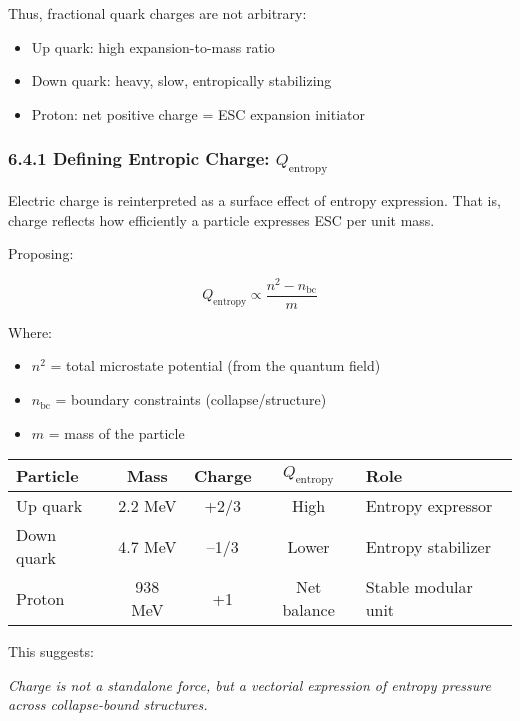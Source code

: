 \documentclass[12pt]{article}
\begin{document}
Thus, fractional quark charges are not arbitrary:
\begin{itemize}
    \item Up quark: high expansion-to-mass ratio
    \item Down quark: heavy, slow, entropically stabilizing
    \item Proton: net positive charge = ESC expansion initiator
\end{itemize}

\subsubsection*{6.4.1 Defining Entropic Charge: $Q_{\text{entropy}}$}

Electric charge is reinterpreted as a surface effect of entropy expression. That is, charge reflects how efficiently a particle expresses ESC per unit mass.

Proposing:

\[
Q_{\text{entropy}} \propto \frac{n^2 - n_{\text{bc}}}{m}
\]

Where:
\begin{itemize}
    \item $n^2$ = total microstate potential (from the quantum field)
    \item $n_{\text{bc}}$ = boundary constraints (collapse/structure)
    \item $m$ = mass of the particle
\end{itemize}

\vspace{0.5em}
\begin{center}
\begin{tabular}{|l|c|c|c|l|}
\hline
\textbf{Particle} & \textbf{Mass} & \textbf{Charge} & $Q_{\text{entropy}}$ & \textbf{Role} \\
\hline
Up quark & 2.2 MeV & +2/3 & High & Entropy expressor \\
\hline
Down quark & 4.7 MeV & –1/3 & Lower & Entropy stabilizer \\
\hline
Proton & 938 MeV & +1 & Net balance & Stable modular unit \\
\hline
\end{tabular}
\end{center}
\vspace{0.5em}

This suggests:

\textit{Charge is not a standalone force, but a vectorial expression of entropy pressure across collapse-bound structures.}
\end{document}
